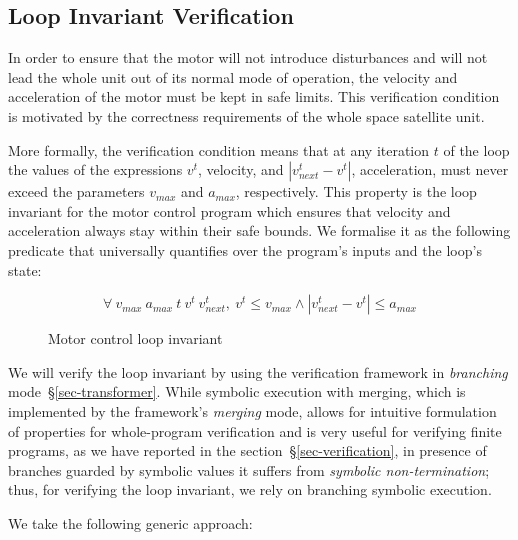 \subsection{Loop Invariant Verification}

In order to ensure that the motor will not introduce disturbances
and will not lead the whole unit out of its normal mode of operation, the velocity and
acceleration of the motor must be kept in safe limits. This verification condition
is motivated by the correctness requirements of the whole space satellite unit.

More formally, the verification condition means
that at any iteration $t$ of the loop the values of the
expressions $v^t$, velocity, and $\left| v^t_{next} - v^t \right|$,
acceleration, must never exceed the parameters $v_{max}$ and $a_{max}$, respectively.
This property is the loop invariant for the motor control program which
ensures that velocity and acceleration always stay within their safe bounds. We
formalise it as the following predicate that universally quantifies over the
program's inputs and the loop's state:

\begin{figure}[H]
\vspace{-4mm}
\begin{tcolorbox}
\LARGE{
\[
  \forall\ v_{max}\ a_{max}\ t\ v^t\ v^t_{next},\ v^t \leq v_{max} \land \left| v^t_{next} - v^t \right| \leq a_{max}
\]}
\end{tcolorbox}
\vspace{-3mm}
\caption{Motor control loop invariant\label{fig-loop-invariant}}
\vspace{-3mm}
\end{figure}

\noindent
We will verify the loop invariant by using the verification framework in
\emph{branching} mode~\S\ref{sec-transformer}. While symbolic execution with
merging, which is implemented by the framework's \emph{merging} mode, allows
for intuitive formulation of properties for whole-program verification and
is very useful for verifying finite programs, as we have
reported in the section~\S\ref{sec-verification}, in presence of branches guarded
by symbolic values it suffers from \emph{symbolic non-termination}; thus,
for verifying the loop invariant, we rely on branching symbolic execution.

\noindent
We take the following generic approach:

